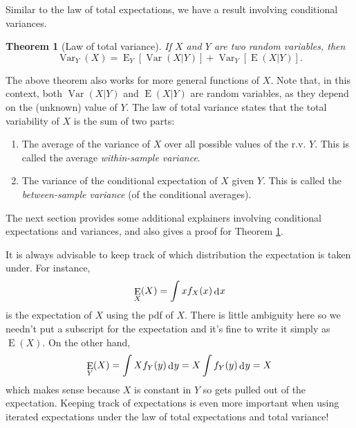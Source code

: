 \documentclass[
]{book}
\providecommand{\tightlist}{%
  \setlength{\itemsep}{0pt}\setlength{\parskip}{0pt}}
\DeclareMathOperator{\E}{E}
\DeclareMathOperator{\Var}{Var}
\DeclareMathOperator{\dd}{d}
\newcommand{\dint}{\dd\hspace{0.5pt}\!}
\newtheorem{theorem}{Theorem}[chapter]
\theoremstyle{definition}
\theoremstyle{definition}
\theoremstyle{definition}
\theoremstyle{definition}
\theoremstyle{remark}
\begin{document}
Similar to the law of total expectations, we have a result involving conditional variances.

\begin{theorem}[Law of total variance]
\protect\hypertarget{thm:lawoftotalvariance}{}\label{thm:lawoftotalvariance}If \(X\) and \(Y\) are two random variables, then
\[
\Var_Y(X) = {\E}_Y\left[\Var(X|Y) \right] + {\Var}_Y\left[\E(X|Y) \right].
\]
\end{theorem}

The above theorem also works for more general functions of \(X\).
Note that, in this context, both \(\Var(X|Y)\) and \(\E(X|Y)\) are random variables, as they depend on the (unknown) value of \(Y\).
The law of total variance states that the total variability of \(X\) is the sum of two parts:

\begin{enumerate}
\def\labelenumi{\arabic{enumi}.}
\tightlist
\item
  The average of the variance of \(X\) over all possible values of the r.v. \(Y\). This is called the average \emph{within-sample variance}.
\item
  The variance of the conditional expectation of \(X\) given \(Y\). This is called the \emph{between-sample variance} (of the conditional averages).
\end{enumerate}

The next section provides some additional explainers involving conditional expectations and variances, and also gives a proof for Theorem \ref{thm:lawoftotalvariance}.

It is always advisable to keep track of which distribution the expectation is taken under.
For instance,
\[
\E_X(X) = \int x f_X(x) \dint x
\]
is the expectation of \(X\) using the pdf of \(X\).
There is little ambiguity here so we needn't put a subscript for the expectation and it's fine to write it simply as \(\E(X)\).
On the other hand,
\[
\E_Y(X) = \int X f_Y(y) \dint y = X \int f_Y(y) \dint y = X
\]
which makes sense because \(X\) is constant in \(Y\) so gets pulled out of the expectation.
Keeping track of expectations is even more important when using iterated expectations under the law of total expectations and total variance!
\end{document}
